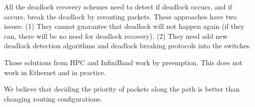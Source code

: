All the deadlock recovery schemes \cite{isca95,shpiner2016unlocking} need to detect if deadlock occurs, and if occurs, break the deadlock by rerouting packets. These approaches have two issues: (1) They cannot guarantee that deadlock will not happen again (if they can, there will be no need for deadlock recovery). (2) They need add new deadlock detection algorithms and deadlock breaking protocols into the switches.

 Those solutions from HPC and InfiniBand
work by preemption. This does not work in Ethernet and in practice.

We believe that deciding the priority of packets along the path is better than changing
routing configurations.
